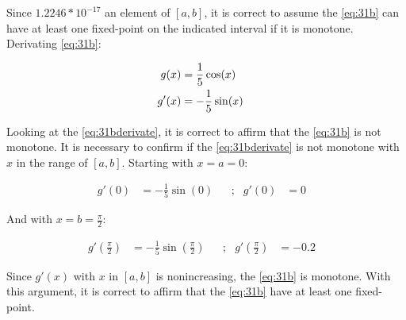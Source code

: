 	Since $1.2246 * 10^{-17}$ an element of $[a,b]$, it is correct to assume the \cref{eq:31b} can have at least one fixed-point on the indicated interval if it is monotone. Derivating \cref{eq:31b}:

	\begin{align}
		g(x) &= \frac{1}{5}\cos(x)& \notag \\
		g'(x) &= -\frac{1}{5}\sin(x)& 
		\label{eq:31bderivate}
	\end{align}

	Looking at the \cref{eq:31bderivate}, it is correct to affirm that the \cref{eq:31b} is not monotone. It is necessary to confirm if the \cref{eq:31bderivate} is not monotone with $x$ in the range of $[a,b]$. Starting with $x = a = 0$:

	\begin{align}
		g'(0) &= -\frac{1}{5}\sin(0)& &;&
		g'(0) &= 0&
	\label{eq:31bderivatepix}
	\end{align}

	And with $x = b = \frac{\pi}{2}$:

	\begin{align}
		g'\left(\frac{\pi}{2}\right) &= -\frac{1}{5}\sin\left(\frac{\pi}{2}\right)& &;&
		g'\left(\frac{\pi}{2}\right) &= -0.2&
	\label{eq:31bderivatepix}
	\end{align}

	Since $g'(x)$ with $x$ in $[a,b]$ is nonincreasing, the \cref{eq:31b} is monotone. With this argument, it is correct to affirm that the \cref{eq:31b} have at least one fixed-point.